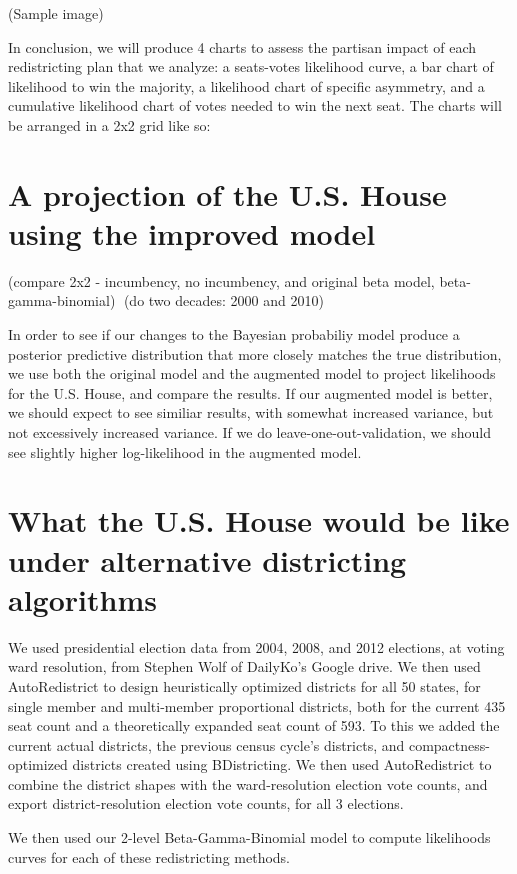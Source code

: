 \documentclass[preprint,12pt]{article}
\begin{document}
(Sample image)

In conclusion, we will produce 4 charts to assess the partisan impact of each redistricting plan that we analyze: a seats-votes likelihood curve, a bar chart of likelihood to win the majority, a likelihood chart of specific asymmetry, and a cumulative likelihood chart of votes needed to win the next seat.  The charts will be arranged in a 2x2 grid like so:


\section{A projection of the U.S. House using the improved model}
(compare 2x2 - incumbency, no incumbency, and original beta model, beta-gamma-binomial)
(do two decades: 2000 and 2010)

In order to see if our changes to the Bayesian probabiliy model produce a posterior predictive distribution that more closely matches the true distribution, we use both the original model and the augmented model to project likelihoods for the U.S. House, and compare the results. If our augmented model is better, we should expect to see similiar results, with somewhat increased variance, but not excessively increased variance.  If we do leave-one-out-validation, we should see slightly higher log-likelihood in the augmented model.


\section{What the U.S. House would be like under alternative districting algorithms}

We used presidential election data from 2004, 2008, and 2012 elections, at voting ward resolution, from Stephen Wolf of DailyKo's Google drive.  We then used AutoRedistrict to design heuristically optimized districts for all 50 states, for single member and multi-member proportional districts, both for the current 435 seat count and a theoretically expanded seat count of 593.  To this we added the current actual districts, the previous census cycle's districts, and compactness-optimized districts created using BDistricting.   We then used AutoRedistrict to combine the district shapes with the ward-resolution election vote counts, and export district-resolution election vote counts, for all 3 elections.

We then used our 2-level Beta-Gamma-Binomial model to compute likelihoods curves for each of these redistricting methods. 
\end{document}
